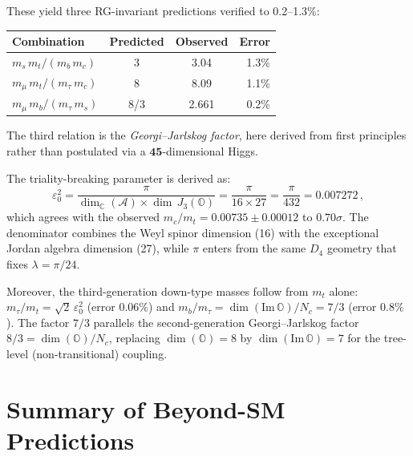\documentclass[12pt,a4paper]{article}
\theoremstyle{definition}
\theoremstyle{remark}
\begin{document}
These yield three RG-invariant predictions verified to 0.2--1.3\%:
\begin{center}
\begin{tabular}{lccr}
\hline
Combination & Predicted & Observed & Error \\
\hline
$m_s\,m_t/(m_b\,m_c)$ & 3 & 3.04 & 1.3\% \\
$m_\mu\,m_t/(m_\tau\,m_c)$ & 8 & 8.09 & 1.1\% \\
$m_\mu\,m_b/(m_\tau\,m_s)$ & 8/3 & 2.661 & 0.2\% \\
\hline
\end{tabular}
\end{center}
The third relation is the \emph{Georgi--Jarlskog factor}, here derived 
from first principles rather than postulated via a 
$\mathbf{45}$-dimensional Higgs.

The triality-breaking parameter is derived as:
\begin{equation}
\varepsilon_0^2 = \frac{\pi}{\dim_\mathbb{C}(\mathcal{A}) \times \dim\,J_3(\mathbb{O})}
= \frac{\pi}{16 \times 27} = \frac{\pi}{432} = 0.007272\,,
\end{equation}
which agrees with the observed $m_c/m_t = 0.00735 \pm 0.00012$ to $0.70\sigma$.
The denominator combines the Weyl spinor dimension (16) with the exceptional 
Jordan algebra dimension (27), while $\pi$ enters from the same $D_4$ geometry 
that fixes $\lambda = \pi/24$.

Moreover, the third-generation down-type masses follow from $m_t$ alone:
$m_\tau/m_t = \sqrt{2}\,\varepsilon_0^2$ (error $0.06\%$) and 
$m_b/m_\tau = \dim(\mathrm{Im}\,\mathbb{O})/N_c = 7/3$ (error $0.8\%$).
The factor $7/3$ parallels the second-generation Georgi--Jarlskog factor 
$8/3 = \dim(\mathbb{O})/N_c$, replacing $\dim(\mathbb{O}) = 8$ by 
$\dim(\mathrm{Im}\,\mathbb{O}) = 7$ for the tree-level (non-transitional) coupling.

\section{Summary of Beyond-SM Predictions}
\label{sec:summary}
\end{document}
